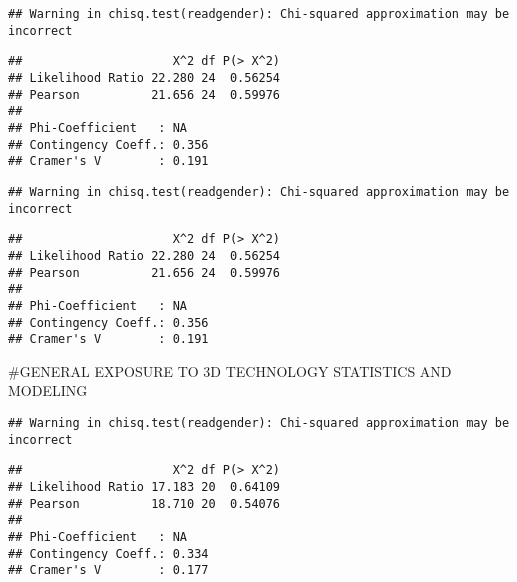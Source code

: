 \documentclass[]{article}
\newenvironment{Shaded}{\begin{snugshade}}{\end{snugshade}}
\newcommand{\DataTypeTok}[1]{\textcolor[rgb]{0.13,0.29,0.53}{#1}}
\newcommand{\KeywordTok}[1]{\textcolor[rgb]{0.13,0.29,0.53}{\textbf{#1}}}
\newcommand{\NormalTok}[1]{#1}
\newcommand{\OperatorTok}[1]{\textcolor[rgb]{0.81,0.36,0.00}{\textbf{#1}}}
\newcommand{\StringTok}[1]{\textcolor[rgb]{0.31,0.60,0.02}{#1}}
\begin{document}
\begin{verbatim}
## Warning in chisq.test(readgender): Chi-squared approximation may be incorrect
\end{verbatim}

\begin{verbatim}
##                     X^2 df P(> X^2)
## Likelihood Ratio 22.280 24  0.56254
## Pearson          21.656 24  0.59976
## 
## Phi-Coefficient   : NA 
## Contingency Coeff.: 0.356 
## Cramer's V        : 0.191
\end{verbatim}

\begin{Shaded}
\end{Shaded}

\begin{verbatim}
## Warning in chisq.test(readgender): Chi-squared approximation may be incorrect
\end{verbatim}

\begin{verbatim}
##                     X^2 df P(> X^2)
## Likelihood Ratio 22.280 24  0.56254
## Pearson          21.656 24  0.59976
## 
## Phi-Coefficient   : NA 
## Contingency Coeff.: 0.356 
## Cramer's V        : 0.191
\end{verbatim}

\#GENERAL EXPOSURE TO 3D TECHNOLOGY STATISTICS AND MODELING

\begin{Shaded}
\end{Shaded}

\begin{verbatim}
## Warning in chisq.test(readgender): Chi-squared approximation may be incorrect
\end{verbatim}

\begin{verbatim}
##                     X^2 df P(> X^2)
## Likelihood Ratio 17.183 20  0.64109
## Pearson          18.710 20  0.54076
## 
## Phi-Coefficient   : NA 
## Contingency Coeff.: 0.334 
## Cramer's V        : 0.177
\end{verbatim}
\end{document}
